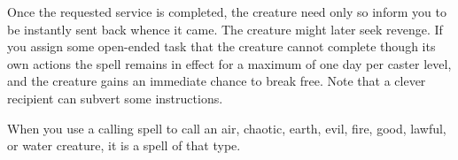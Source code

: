 {	Once the requested service is completed, the creature need only so inform you to be instantly sent back whence it came. The creature might later seek revenge. If you assign some open-ended task that the creature cannot complete though its own actions the spell remains in effect for a maximum of one day per caster level, and the creature gains an immediate chance to break free. Note that a clever recipient can subvert some instructions.

	When you use a calling spell to call an air, chaotic, earth, evil, fire, good, lawful, or water creature, it is a spell of that type.

}
